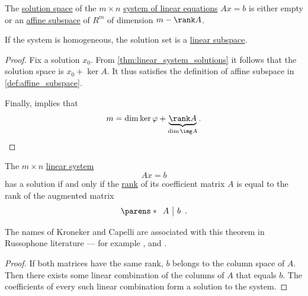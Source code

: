 \begin{corollary}\label{thm:linear_system_solution_space}
  The \hyperref[def:system_of_linear_equations/solution_space]{solution space} of the \( m \times n \) \hyperref[def:system_of_linear_equations]{system of linear equations} \( Ax = b \) is either empty or an \hyperref[def:affine_subspace]{affine subspace} of \( R^m \) of dimension \( m - \rank A \).

  If the system is homogeneous, the solution set is a \hyperref[def:module/subobject]{linear subspace}.
\end{corollary}
\begin{proof}
  Fix a solution \( x_0 \). From \cref{thm:linear_system_solutions} it follows that the solution space is \( x_0 + \ker A \). It thus satisfies the definition of affine subspace in \cref{def:affine_subspace}.

  Finally,  implies that
  \begin{equation*}
    m = \dim \ker \varphi + \underbrace{ \rank A }_{ \dim \img A }.
  \end{equation*}
\end{proof}

\begin{theorem}\label{thm:kroneker_capelli}
  The \( m \times n \) \hyperref[def:system_of_linear_equations]{linear system}
  \begin{equation*}
    Ax = b
  \end{equation*}
  has a solution if and only if the \hyperref[def:rank_and_nullity]{rank} of its coefficient matrix \( A \) is equal to the rank of the augmented matrix
  \begin{equation*}
    \parens*
    {
      \begin{array}{c|c}
        A & b
      \end{array}
    }.
  \end{equation*}
\end{theorem}
\begin{comments}
  \item The names of Kroneker and Capelli are associated with this theorem in Russophone literature --- for example \textcite[\S 7.8]{Тыртышников2007ЛинейнаяАлгебра}, \textcite[thm. 2.3.1]{Винберг2014КурсАлгебры} and \textcite[78]{Курош1968КурсВысшейАлгебры}.
\end{comments}
\begin{proof}
  If both matrices have the same rank, \( b \) belongs to the column space of \( A \). Then there exists some linear combination of the columns of \( A \) that equals \( b \). The coefficients of every such linear combination form a solution to the system.
\end{proof}
